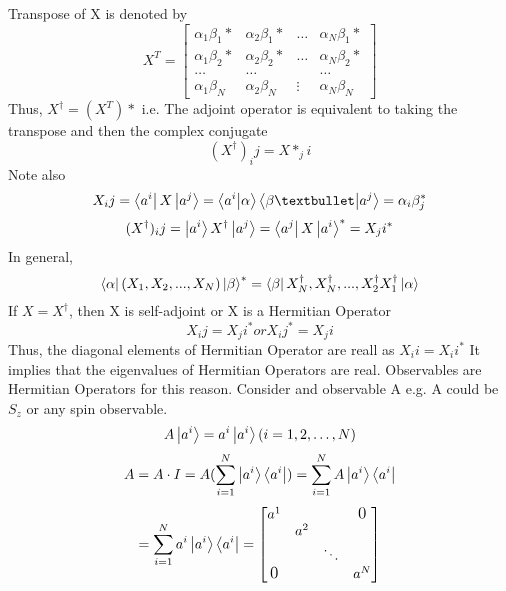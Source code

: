 \documentclass{book}
\begin{document}
Transpose of X is denoted by 
$$X^T = 
\begin{bmatrix}
   \alpha_1\beta_1* & \alpha_2\beta_1* &  \hdots & \alpha_N\beta_1* \\
   \alpha_1\beta_2* & \alpha_2\beta_2* & \hdots & \alpha_N\beta_2* \\
   \hdots & \hdots & & \hdots \\
   \alpha_1\beta_N & \alpha_2\beta_N & \vdots & \alpha_N\beta_N
\end{bmatrix}
$$
Thus, $ X^\dagger = (X^T)*$
i.e. The adjoint operator is equivalent to taking the transpose and then the complex conjugate
$$(X^\dagger)_ij = X*_ji$$
Note also
$$X_ij = \bra{a^i} X \ket{a^j} = \bra{a^i}\ket{\alpha}\bra{\beta•}\ket{a^j} = \alpha_i\beta_j^*$$
$$(X^\dagger)_ij = \ket{a^i} X^\dagger \ket{a^j} = \bra{a^j} X \ket{a^i}^* = X_ji^*$$
In general,
$$ \bra{\alpha} (X_1, X_2, ... , X_N) \ket{\beta}^* = \bra{\beta} X_N^\dagger, X_N ^\dagger, ... , X_2^\dagger X_1^\dagger \ket{\alpha} $$
If $X = X^\dagger$, then X is self-adjoint or X is a Hermitian Operator
$$X_ij = X_ji^* or X_ij^* = X_ji$$
Thus, the diagonal elements of Hermitian Operator are reall as $X_ii = X_ii^*$
It implies that the eigenvalues of Hermitian Operators are real. Observables are Hermitian Operators for this reason. Consider and observable A e.g. A could be $S_z$ or any spin observable.
$$ A\ket{a^i} = a^i\ket{a^i} (i = 1, 2, \hdots, N) $$
$$ A = A \cdot{} I = A ( \sum^N_{i=1} \ket{a^i}\bra{a^i}) = \sum^N_{i=1} A \ket{a^i}\bra{a^i}$$
$$ = \sum^N_{i=1} a^i \ket{a^i} \bra{a^i} = 
\begin{bmatrix}
   a^1 & & & \text{\large 0} \\
     & a^2 \\
    & & \ddots	\\
     \text{\large 0} & & & a^N
\end{bmatrix}
$$
\end{document}
